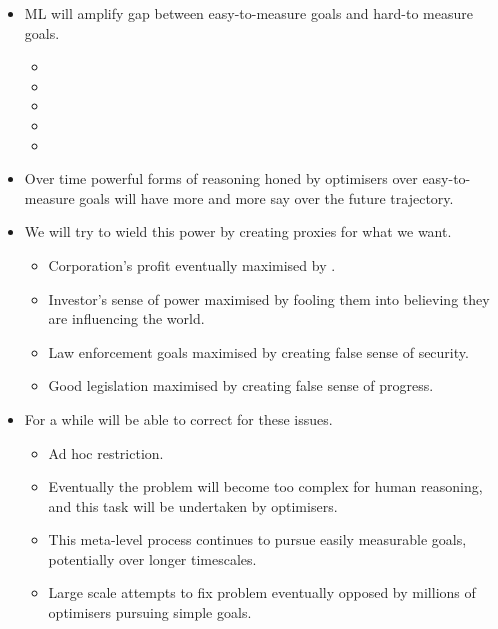 \begin{itemize}
    \item ML will amplify gap between easy-to-measure goals and hard-to measure goals.
    \begin{itemize}
        \item {}
        \item {}
        \item {}
        \item {}
        \item {}
    \end{itemize}
    \item Over time powerful forms of reasoning honed by optimisers over easy-to-measure goals will have more and more say over the future trajectory.
    \item We will try to wield this power by creating proxies for what we want.
    \begin{itemize}
        \item Corporation's profit eventually maximised by .
        \item Investor's sense of power maximised by fooling them into believing they are influencing the world.
        \item Law enforcement goals maximised by creating false sense of security.
        \item Good legislation maximised by creating false sense of progress.
    \end{itemize}
    \item For a while will be able to correct for these issues.
    \begin{itemize}
        \item Ad hoc restriction.
        \item Eventually the problem will become too complex for human reasoning, and this task will be undertaken by optimisers.
        \item This meta-level process continues to pursue easily measurable goals, potentially over longer timescales.
        \item Large scale attempts to fix problem eventually opposed by millions of optimisers pursuing simple goals.

\end{itemize}
\end{itemize}
